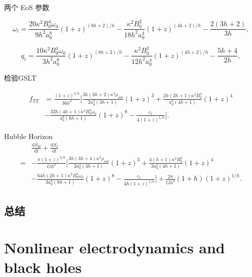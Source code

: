 \documentclass[9pt, dvipsnames]{beamer} %
\begin{document}
\begin{frame}
    两个 EoS 参数

    $$
    \omega_t
    =\frac{20\kappa^2 B_0^4 \omega_0 }{9h^2a_0^8 } \left(1+z \right)^{(8h+2)/h} - \frac{\kappa^2 B_0^2 }{18h^2 a_0^4 } (1+z)^{(4h+2)/h} - \frac{2(3h+2) }{3h } ,
    $$

    $$
    q_t
    =\frac{10\kappa^2 B_0^4 \omega_0 }{3h^2 a_0^8 } (1+z)^{(8h+2)/h} - \frac{\kappa^2 B_0^2 }{12 h^2 a_0^4 } (1+z)^{(4h+2)/h} - \frac{5h+4 }{2h } ,
    $$
    
\end{frame}

\begin{frame}{检验GSLT}

    $$
    \begin{aligned}
        f_{TT}
        &=\frac{(1+z)^{4/h} }{36h^4 } \bigg[\frac{3h(3h+2)\kappa^2\rho_{m0} }{2a_0^3(3h+1) }(1+z)^3 + \frac{2h(2h+1)\kappa^2 B_0^2 }{a_0^4(4h+1) } (1+z)^4 \\
        &- \frac{32h(4h+1)\kappa^2 B_0^4 \omega_0 }{a_0^8 (8h+1) } (1+z)^8 - \frac{c_1 }{4(1+z)^{1/h} }   \bigg].
    \end{aligned}
    $$
    
\end{frame}

\begin{frame}{Hubble Horizon}
    $$
    \begin{aligned}
        &\frac{\mathrm{d}S_H }{\mathrm{d}t } + \frac{\mathrm{d}S_I }{\mathrm{d}t } \\
        =&-\frac{\pi(1+z)^{3/h} }{Gh^3 } \bigg[\frac{3h(3h+4)\kappa^2\rho_{m0} }{2a_0^3(3h+1) }(1+z)^3 + \frac{4(h+1)\kappa^2 B_0^2 }{3a_0^4(4h+1) } (1+z)^4 \\
        &- \frac{64h(2h+1)\kappa^2 B_0^4 \omega_0 }{3a_0^8 (8h+1) } (1+z)^8- \frac{c_1 }{4h(1+z)^{1/h} } \bigg] + \frac{2\pi }{G h^3 } (1+h)(1+z)^{1/h}.
    \end{aligned}
    $$
\end{frame}

\subsection{总结}



\section{Nonlinear electrodynamics and black holes}
\end{document}
